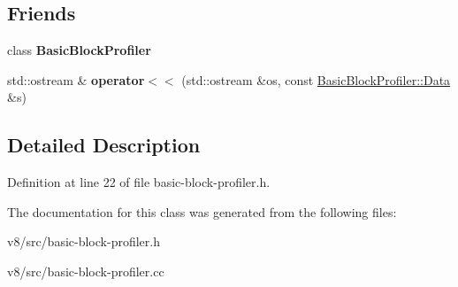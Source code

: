 \subsection*{Friends}
\begin{DoxyCompactItemize}
\item 
\mbox{\label{classv8_1_1internal_1_1BasicBlockProfiler_1_1Data_a05ed5b31a23bf57caa59bca8951c3ba9}} 
class {\bfseries Basic\+Block\+Profiler}
\item 
\mbox{\label{classv8_1_1internal_1_1BasicBlockProfiler_1_1Data_a94126580a7f5d55b9013bdd1a6c93016}} 
std\+::ostream \& {\bfseries operator$<$$<$} (std\+::ostream \&os, const \mbox{\hyperlink{classv8_1_1internal_1_1BasicBlockProfiler_1_1Data}{Basic\+Block\+Profiler\+::\+Data}} \&s)
\end{DoxyCompactItemize}


\subsection{Detailed Description}


Definition at line 22 of file basic-\/block-\/profiler.\+h.



The documentation for this class was generated from the following files\+:\begin{DoxyCompactItemize}
\item 
v8/src/basic-\/block-\/profiler.\+h\item 
v8/src/basic-\/block-\/profiler.\+cc\end{DoxyCompactItemize}
